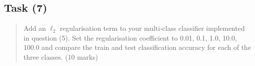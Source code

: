 \documentclass[11pt]{article}
\begin{document}
    \hypertarget{task-7}{%
\subsection{Task (7)}\label{task-7}}

\begin{quote}
Add an \(\ell_{2}\) regularisation term to your multi-class classifier
implemented in question (5). Set the regularisation coefficient to 0.01,
0.1, 1.0, 10.0, 100.0 and compare the train and test classification
accuracy for each of the three classes. (10 marks)
\end{quote}


    
    
    
\end{document}
